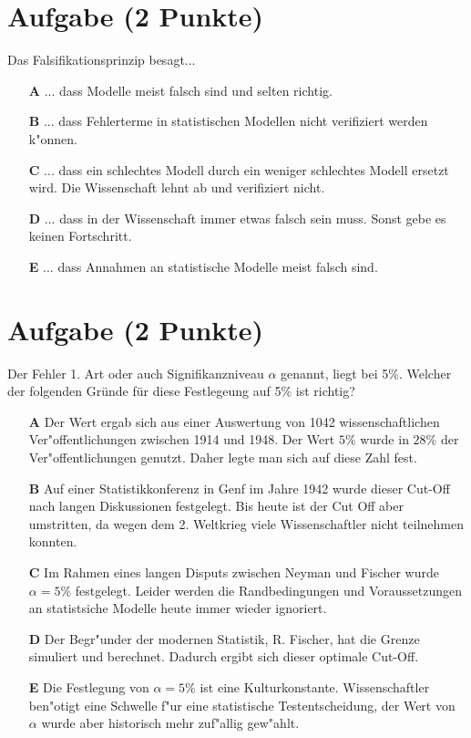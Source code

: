 \documentclass[a4paper, 10pt]{scrartcl}\usepackage[]{graphicx}\usepackage[]{xcolor}
\begin{document}
\section{Aufgabe \hfill (2 Punkte)}

Das Falsifikationsprinzip besagt... 



\begin{enumerate}
\item [\textbf{A} \msquare] ... dass Modelle meist falsch sind und selten richtig.
\item [\textbf{B} \msquare] ... dass Fehlerterme in statistischen Modellen nicht verifiziert werden k{"o}nnen.
\item [\textbf{C} \msquare] ... dass ein schlechtes Modell durch ein weniger schlechtes Modell ersetzt wird. Die Wissenschaft lehnt ab und verifiziert nicht.
\item [\textbf{D} \msquare] ... dass in der Wissenschaft immer etwas falsch sein muss. Sonst gebe es keinen Fortschritt.
\item [\textbf{E} \msquare] ... dass Annahmen an statistische Modelle meist falsch sind.
\end{enumerate}

\section{Aufgabe \hfill (2 Punkte)}

Der Fehler 1. Art oder auch Signifikanzniveau $\alpha$ genannt, liegt bei
5\%. Welcher der folgenden Gr{\"u}nde f{\"u}r diese Festlegeung auf 5\% ist richtig?



\begin{enumerate}
\item [\textbf{A} \msquare] Der Wert ergab sich aus einer Auswertung von 1042 wissenschaftlichen Ver{"o}ffentlichungen zwischen 1914 und 1948. Der Wert $5\%$ wurde in $28\%$ der Ver{"o}ffentlichungen genutzt. Daher legte man sich auf diese Zahl fest.
\item [\textbf{B} \msquare] Auf einer Statistikkonferenz in Genf im Jahre 1942 wurde dieser Cut-Off nach langen Diskussionen festgelegt. Bis heute ist der Cut Off aber umstritten, da wegen dem 2. Weltkrieg viele Wissenschaftler nicht teilnehmen konnten.
\item [\textbf{C} \msquare] Im Rahmen eines langen Disputs zwischen Neyman und Fischer wurde $\alpha = 5\%$ festgelegt. Leider werden die Randbedingungen und Voraussetzungen an statistsiche Modelle heute immer wieder ignoriert.
\item [\textbf{D} \msquare] Der Begr{"u}nder der modernen Statistik, R. Fischer, hat die Grenze simuliert und berechnet. Dadurch ergibt sich dieser optimale Cut-Off.
\item [\textbf{E} \msquare] Die Festlegung von $\alpha = 5\%$ ist eine Kulturkonstante. Wissenschaftler ben{"o}tigt eine Schwelle f{"u}r eine statistische Testentscheidung, der Wert von $\alpha$ wurde aber historisch mehr zuf{"a}llig gew{"a}hlt.
\end{enumerate}
\end{document}
